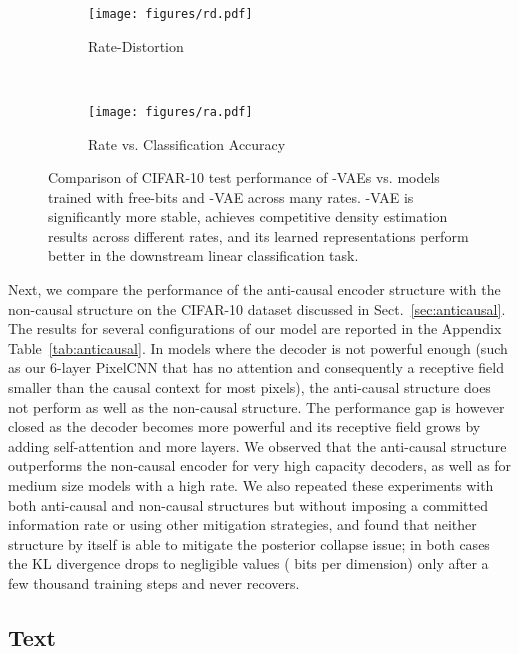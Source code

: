 \documentclass{article} \usepackage{iclr2019_conference,times}
\newcommand{\tblref}[1]{Table~\ref{#1}}
\newcommand{\sref}[1]{Sect.~\ref{#1}}
\begin{document}
\begin{figure}[h]
    \vspace{-1cm}
    \centering
    \begin{subfigure}{0.49\textwidth}
        \centering
        \texttt{[image: figures/rd.pdf]}
        \caption{Rate-Distortion}        
        \label{fig:rd}
    \end{subfigure}
    ~
    \begin{subfigure}{0.49\textwidth}
        \centering
        \texttt{[image: figures/ra.pdf]}
        \caption{Rate vs. Classification Accuracy}
        \label{fig:ra}
    \end{subfigure}
    \caption{Comparison of CIFAR-10 test performance of -VAEs vs. models trained with free-bits and -VAE across many rates. -VAE is significantly more stable, achieves competitive density estimation results across different rates, and its learned representations perform better in the downstream linear classification task.} 
    \label{fig:rda}
\end{figure}

Next, we compare the performance of the anti-causal encoder structure with the non-causal structure on the CIFAR-10 dataset discussed in \sref{sec:anticausal}. The results for several configurations of our model are reported in the Appendix \tblref{tab:anticausal}. 
In  models where the decoder is not powerful enough (such as our 6-layer PixelCNN that has no attention and consequently a receptive field smaller than the causal context for most pixels), the anti-causal structure does not perform as well as the non-causal structure. The performance gap is however closed as the decoder becomes more powerful and its receptive field grows by adding self-attention and more layers. We observed that the anti-causal structure outperforms the non-causal encoder for very high capacity decoders, as well as for medium size models with a high rate. We also repeated these experiments with both anti-causal and non-causal structures
but without imposing a committed information rate or using other mitigation strategies, and found that neither structure by itself is able to mitigate the posterior collapse issue; in both cases the KL divergence drops to negligible values ( bits per dimension) only after a few thousand training steps and never recovers. 


\subsection{Text}
\end{document}

